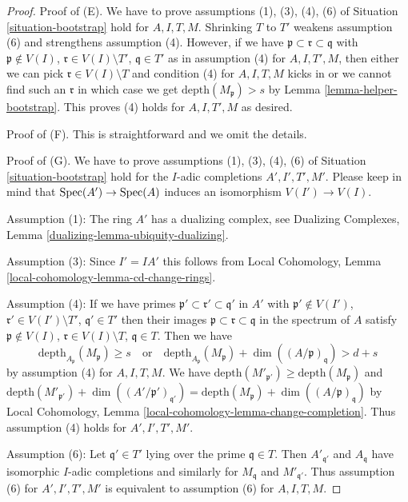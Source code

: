 \begin{proof}
Proof of (E). We have to prove assumptions (1), (3), (4), (6)
of Situation \ref{situation-bootstrap} hold for
$A, I, T, M$. Shrinking $T$ to $T'$
weakens assumption (6) and strengthens assumption (4). However, if we have
$\mathfrak p \subset \mathfrak r \subset \mathfrak q$ with
$\mathfrak p \not \in V(I)$, $\mathfrak r \in V(I) \setminus T'$,
$\mathfrak q \in T'$ as in assumption (4) for $A, I, T', M$, then
either we can pick $\mathfrak r \in V(I) \setminus T$ and
condition (4) for $A, I, T, M$ kicks in or we cannot
find such an $\mathfrak r$ in which case we get
$\text{depth}(M_\mathfrak p) > s$ by Lemma \ref{lemma-helper-bootstrap}.
This proves (4) holds for $A, I, T', M$ as desired.

\medskip\noindent
Proof of (F). This is straightforward and we omit the details.

\medskip\noindent
Proof of (G). We have to prove assumptions (1), (3), (4), (6)
of Situation \ref{situation-bootstrap} hold for the $I$-adic
completions $A', I', T', M'$. Please keep in mind that
$\mathop{\mathrm{Spec}}(A') \to \mathop{\mathrm{Spec}}(A)$ induces an isomorphism $V(I') \to V(I)$.

\medskip\noindent
Assumption (1): The ring $A'$ has a dualizing complex, see
Dualizing Complexes, Lemma \ref{dualizing-lemma-ubiquity-dualizing}.

\medskip\noindent
Assumption (3): Since $I' = IA'$ this follows from Local Cohomology,
Lemma \ref{local-cohomology-lemma-cd-change-rings}.

\medskip\noindent
Assumption (4): If we have primes
$\mathfrak p' \subset \mathfrak r' \subset \mathfrak q'$ in $A'$
with $\mathfrak p' \not \in V(I')$,
$\mathfrak r' \in V(I') \setminus T'$,
$\mathfrak q' \in T'$ then their images
$\mathfrak p \subset \mathfrak r \subset \mathfrak q$ in
the spectrum of $A$
satisfy
$\mathfrak p \not \in V(I)$, $\mathfrak r \in V(I) \setminus T$,
$\mathfrak q \in T$.
Then we have
$$
\text{depth}_{A_\mathfrak p}(M_\mathfrak p) \geq s
\quad\text{or}\quad
\text{depth}_{A_\mathfrak p}(M_\mathfrak p) +
\dim((A/\mathfrak p)_\mathfrak q) > d + s
$$
by assumption (4) for $A, I, T, M$. We have
$\text{depth}(M'_{\mathfrak p'}) \geq \text{depth}(M_\mathfrak p)$ and
$\text{depth}(M'_{\mathfrak p'}) +
\dim((A'/\mathfrak p')_{\mathfrak q'}) =
\text{depth}(M_\mathfrak p) +
\dim((A/\mathfrak p)_\mathfrak q)$
by Local Cohomology, Lemma \ref{local-cohomology-lemma-change-completion}.
Thus assumption (4) holds for $A', I', T', M'$.

\medskip\noindent
Assumption (6): Let $\mathfrak q' \in T'$ lying over the
prime $\mathfrak q \in T$. Then $A'_{\mathfrak q'}$
and $A_\mathfrak q$ have isomorphic $I$-adic completions
and similarly for $M_\mathfrak q$ and $M'_{\mathfrak q'}$.
Thus assumption (6) for $A', I', T', M'$ is equivalent
to assumption (6) for $A, I, T, M$.


\end{proof}
